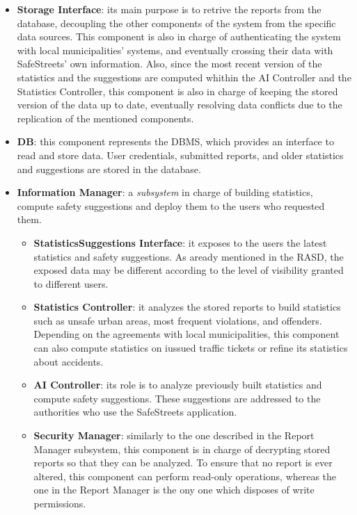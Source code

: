 \documentclass{report}
\begin{document}
\begin{itemize}
\begin{itemize}
\end{itemize}
\item \textbf{Storage Interface}: its main purpose is to retrive the reports from the database, decoupling the other components of the system from the specific data sources. This component is also in charge of authenticating the system with local municipalities' systems, and eventually crossing their data with SafeStreets' own information. Also, since the most recent version of the statistics and the suggestions are computed whithin the AI Controller and the Statistics Controller, this component is also in charge of keeping the stored version of the data up to date, eventually resolving data conflicts due to the replication of the mentioned components.
\item \textbf{DB}: this component represents the DBMS, which provides an interface to read and store data. User credentials, submitted reports, and older statistics and suggestions are stored in the database.
\item \textbf{Information Manager}: a \textit{subsystem} in charge of building statistics, compute safety suggestions and deploy them to the users who requested them.
    \begin{itemize}
        \item \textbf{StatisticsSuggestions Interface}: it exposes to the users the latest statistics and safety suggestions. As aready mentioned in the RASD, the exposed data may be different according to the level of visibility granted to different users.
        \item \textbf{Statistics Controller}: it analyzes the stored reports to build statistics such as unsafe urban areas, most frequent violations, and offenders. Depending on the agreements with local municipalities, this component can also compute statistics on iussued traffic tickets or refine its statistics about accidents.
        \item \textbf{AI Controller}: its role is to analyze previously built statistics and compute safety suggestions. These suggestions are addressed to the authorities who use the SafeStreets application.
        \item \textbf{Security Manager}: similarly to the one described in the Report Manager subsystem, this component is in charge of decrypting stored reports so that they can be analyzed. To ensure that no report is ever altered, this component can perform read-only operations, whereas the one in the Report Manager is the ony one which disposes of write permissions.

\end{itemize}
\end{itemize}
\end{document}

